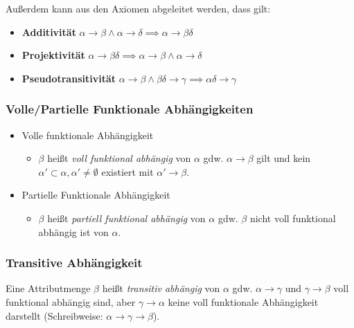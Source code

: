 		Außerdem kann aus den Axiomen abgeleitet werden, dass gilt:
		\begin{itemize}
			\item \textbf{Additivität} \( \alpha \rightarrow \beta \land \alpha \rightarrow \delta \implies \alpha \rightarrow \beta\delta \)
			\item \textbf{Projektivität} \( \alpha \rightarrow \beta\delta \implies \alpha \rightarrow \beta \land \alpha \rightarrow \delta \)
			\item \textbf{Pseudotransitivität} \( \alpha \rightarrow \beta \land \beta\delta \rightarrow \gamma \implies \alpha\delta \rightarrow \gamma \)
		\end{itemize}

	\subsubsection{Volle/Partielle Funktionale Abhängigkeiten} %
		\begin{itemize}
			\item Volle funktionale Abhängigkeit
				\begin{itemize}
					\item \(\beta\) heißt \textit{voll funktional abhängig} von \(\alpha\) gdw. \(\alpha \rightarrow \beta\) gilt und kein \( \alpha' \subset \alpha, \alpha' \neq \emptyset \) existiert mit \( \alpha' \rightarrow \beta \).
				\end{itemize}
			\item Partielle Funktionale Abhängigkeit
				\begin{itemize}
					\item \( \beta \) heißt \textit{partiell funktional abhängig} von \(\alpha\) gdw. \(\beta\) nicht voll funktional abhängig ist von \(\alpha\).
				\end{itemize}
		\end{itemize}

	\subsubsection{Transitive Abhängigkeit} %
		Eine Attributmenge \(\beta\) heißt \textit{transitiv abhängig} von \(\alpha\) gdw. \(\alpha \rightarrow \gamma\) und \(\gamma \rightarrow \beta\) voll funktional abhängig sind, aber \(\gamma \rightarrow \alpha\) keine voll funktionale Abhängigkeit darstellt (Schreibweise: \( \alpha \rightarrow \gamma \rightarrow \beta \)).

